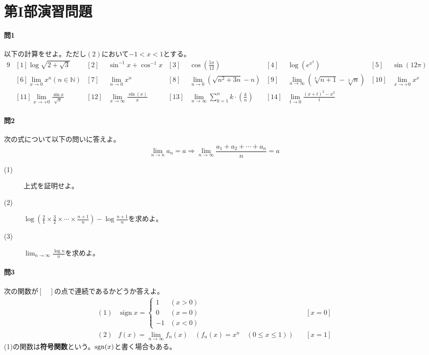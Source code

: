 \documentclass[a4j,dvipdfmx]{jsarticle}
\newcommand{\sign}{\mathop{\mathrm{sign}}\nolimits}
\begin{document}
            \section{第I部演習問題}
                \paragraph{問1} 以下の計算をせよ。ただし$(2)$において$-1<x<1$とする。
                    \begin{alignat*}{9}
                        &[1]\log\sqrt{2+\sqrt{3}} &[2]&\sin^{-1}x+\cos^{-1}x &[3]&\cos\left(\frac{5\pi}{12}\right) & [4]&\log(e^{x^2}) & [5]&\sin(12\pi)\\
                        &[6]\lim_{x\to 0}x^n(n\in\mathbb{N}) &[7]&\lim_{n\to 0}x^n &[8]&\lim_{n\to 0}(\sqrt{n^2+3n}-n) &[9]&\lim_{n\to\infty}(\sqrt[3]{n+1}-\sqrt[3]{n}) & [10]&\lim_{x\to +0}x^x\\
                        &[11]\lim_{x\to +0}\frac{\sin x}{\sqrt{x}} &[12]& \lim_{x\to\infty}\frac{\sin(x)}{x} &[13]&\lim_{n\to\infty}\sum_{k=1}^{n}k\cdot\left(\frac{k}{n}\right) &[14]&\lim_{t\to 0}\frac{(x+t)^2-x^2}{t}
                    \end{alignat*}
                \paragraph{問2}次の式について以下の問いに答えよ。
                    \begin{equation}
                        \lim_{n\to n}a_n=a \Rightarrow \lim_{n\to\infty}\frac{a_1+a_2+\cdots+a_n}{n}=a
                    \end{equation}
                    \begin{description}
                        \item[(1\textrm{)}] 上式を証明せよ。
                        \item[(2\textrm{)}] $\log\left(\frac{2}{1}\times\frac{3}{2}\times\cdots\times\frac{n+1}{n}\right)-\log\frac{n+1}{n}$を求めよ。
                        \item[(3\textrm{)}] $\displaystyle \lim_{n\to\infty}\frac{\log n}{n}$を求めよ。
                    \end{description}
                
                \paragraph{問3}
                    次の関数が$[\quad]$の点で連続であるかどうか答えよ。
                    \begin{align*}
                        (1)&\sign x = \left\{\begin{array}{cc}\displaystyle 1 & (x>0) \\ 0 & (x=0) \\ -1 & (x<0)\end{array}\right.&\quad [x=0]\\
                        (2)&f(x)=\lim_{n\to \infty}f_n(x)\quad (f_n(x)=x^n\quad(0\leq x\leq 1))&\quad [x=1]
                    \end{align*} 
                    (1)の関数は\textbf{符号関数}という。${\rm sgn}(x)$と書く場合もある。
\end{document}
